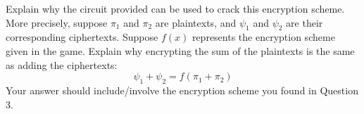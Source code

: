 \documentclass{article}
\begin{document}
\begin{qu}
    Explain why the circuit provided can be used to crack this encryption scheme. \vsp
    More precisely, suppose $ \pi_{1} $ and $ \pi_{2} $ are plaintexts, and $ \psi_{1} $ and
    $ \psi_{2} $ are their corresponding ciphertexts. Suppose $ f(x) $ represents the encryption
    scheme given in the game. Explain why encrypting the sum of the plaintexts is the same as
    adding the ciphertexts:
    \begin{equation*}
        \psi_{1} + \psi_{2} = f(\pi_{1} + \pi_{2})
    \end{equation*}
    Your answer should include/involve the encryption scheme you found in Question 3.
\end{qu}
\end{document}
